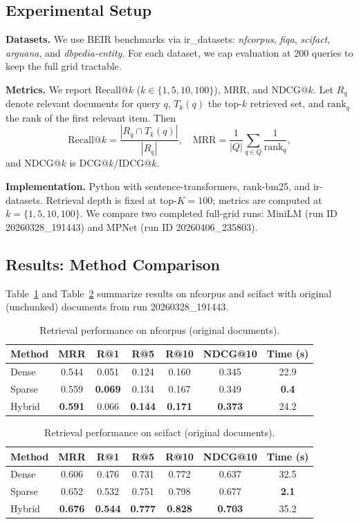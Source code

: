 \documentclass[twoside,11pt]{article}
\begin{document}
\subsection{Experimental Setup}

\textbf{Datasets.} We use BEIR benchmarks via ir\_datasets: \textit{nfcorpus}, \textit{fiqa}, \textit{scifact}, \textit{arguana}, and \textit{dbpedia-entity}. For each dataset, we cap evaluation at 200 queries to keep the full grid tractable.

\textbf{Metrics.} We report Recall@$k$ ($k \in \{1, 5, 10, 100\}$), MRR, and NDCG@$k$. Let $R_q$ denote relevant documents for query $q$, $T_k(q)$ the top-$k$ retrieved set, and $\text{rank}_q$ the rank of the first relevant item. Then
\[
\text{Recall@}k = \frac{|R_q \cap T_k(q)|}{|R_q|}, \quad
\text{MRR} = \frac{1}{|Q|}\sum_{q \in Q}\frac{1}{\text{rank}_q},
\]
and NDCG@$k$ is DCG@$k$/IDCG@$k$.

\textbf{Implementation.} Python with sentence-transformers, rank-bm25, and ir-datasets. Retrieval depth is fixed at top-$K=100$; metrics are computed at $k=\{1,5,10,100\}$. We compare two completed full-grid runs: MiniLM (run ID 20260328\_191443) and MPNet (run ID 20260406\_235803).

\subsection{Results: Method Comparison}

Table~\ref{tab:nfcorpus} and Table~\ref{tab:scifact} summarize results on nfcorpus and scifact with original (unchunked) documents from run 20260328\_191443.

\begin{table}[htbp]
\centering
\caption{Retrieval performance on nfcorpus (original documents).}
\label{tab:nfcorpus}
\begin{tabular}{lcccccc}
\toprule
Method & MRR & R@1 & R@5 & R@10 & NDCG@10 & Time (s) \\
\midrule
Dense  & 0.544 & 0.051 & 0.124 & 0.160 & 0.345 & 22.9 \\
Sparse & 0.559 & \textbf{0.069} & 0.134 & 0.167 & 0.349 & \textbf{0.4} \\
Hybrid & \textbf{0.591} & 0.066 & \textbf{0.144} & \textbf{0.171} & \textbf{0.373} & 24.2 \\
\bottomrule
\end{tabular}
\end{table}

\begin{table}[htbp]
\centering
\caption{Retrieval performance on scifact (original documents).}
\label{tab:scifact}
\begin{tabular}{lcccccc}
\toprule
Method & MRR & R@1 & R@5 & R@10 & NDCG@10 & Time (s) \\
\midrule
Dense  & 0.606 & 0.476 & 0.731 & 0.772 & 0.637 & 32.5 \\
Sparse & 0.652 & 0.532 & 0.751 & 0.798 & 0.677 & \textbf{2.1} \\
Hybrid & \textbf{0.676} & \textbf{0.544} & \textbf{0.777} & \textbf{0.828} & \textbf{0.703} & 35.2 \\
\bottomrule
\end{tabular}
\end{table}
\end{document}
